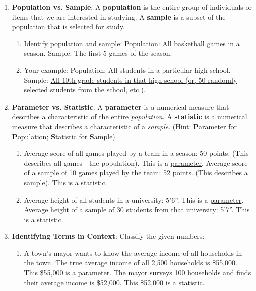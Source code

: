 \documentclass[12pt]{article}
\begin{document}
\begin{enumerate}[label=28.\arabic*]
    \item \textbf{Population vs. Sample}:
    A \textbf{population} is the entire group of individuals or items that we are interested in studying.
    A \textbf{sample} is a subset of the population that is selected for study.
    \begin{enumerate}[label=\alph*)]
        \item Identify population and sample:
        Population: All basketball games in a season.
        Sample: The first 5 games of the season.
        \item Your example:
        Population: All students in a particular high school.
        Sample: \underline{All 10th-grade students in that high school (or, 50 randomly selected students from the school, etc.)}.
    \end{enumerate}
    \item \textbf{Parameter vs. Statistic}:
    A \textbf{parameter} is a numerical measure that describes a characteristic of the entire \textit{population}.
    A \textbf{statistic} is a numerical measure that describes a characteristic of a \textit{sample}.
    (Hint: \textbf{P}arameter for \textbf{P}opulation; \textbf{S}tatistic for \textbf{S}ample)
    \begin{enumerate}[label=\alph*)]
        \item Average score of all games played by a team in a season: 50 points. (This describes all games - the population). This is a \underline{parameter}.
        Average score of a sample of 10 games played by the team: 52 points. (This describes a sample). This is a \underline{statistic}.
        \item Average height of all students in a university: 5’6”. This is a \underline{parameter}.
        Average height of a sample of 30 students from that university: 5’7”. This is a \underline{statistic}.
    \end{enumerate}
    \item \textbf{Identifying Terms in Context}: Classify the given numbers:
    \begin{enumerate}[label=\alph*)]
        \item A town's mayor wants to know the average income of all households in the town. The true average income of all 2,500 households is \$55,000. This \$55,000 is a \underline{parameter}.
        The mayor surveys 100 households and finds their average income is \$52,000. This \$52,000 is a \underline{statistic}.

\end{enumerate}
\end{enumerate}
\end{document}
